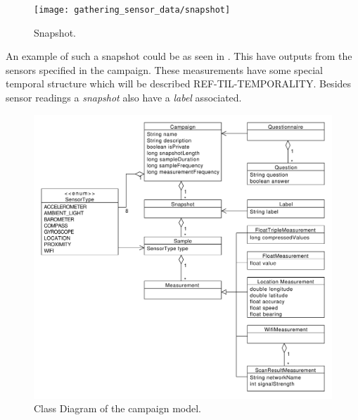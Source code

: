 \begin{figure}[!htbp]
    \centering
    \texttt{[image: gathering\_sensor\_data/snapshot]}
    \caption{Snapshot.}
    \label{fig:snapshot_example}
\end{figure}
\FloatBarrier

An example of such a snapshot could be as seen in . This have outputs from the sensors specified in the campaign. These measurements have some special temporal structure which will be described REF-TIL-TEMPORALITY. Besides sensor readings a \emph{snapshot} also have a \emph{label} associated. 


\begin{figure}[!htbp]
    \centering
    \includegraphics[width=\textwidth]{graphic/gathering_sensor_data/model_class_diagram.pdf}
    \caption{Class Diagram of the campaign model.}
    \label{fig:model_class_diagram}
\end{figure}
\FloatBarrier


